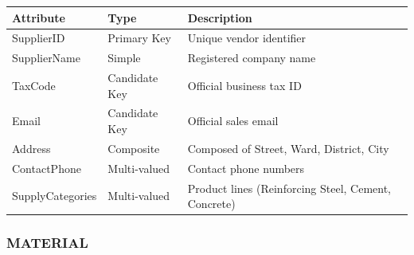 \documentclass[a4paper,12pt]{report}
\newcounter{none} %
\begin{document}
{\def\LTcaptype{none} %
\begin{longtable}[]{@{}
  >{\raggedright\arraybackslash}p{}
  >{\raggedright\arraybackslash}p{}
  >{\raggedright\arraybackslash}p{}@{}}
\toprule\noalign{}
\begin{minipage}[b]{\linewidth}\raggedright
Attribute
\end{minipage} & \begin{minipage}[b]{\linewidth}\raggedright
Type
\end{minipage} & \begin{minipage}[b]{\linewidth}\raggedright
Description
\end{minipage} \\
\midrule\noalign{}
\endhead
\bottomrule\noalign{}
\endlastfoot
SupplierID & Primary Key & Unique vendor identifier \\
SupplierName & Simple & Registered company name \\
TaxCode & Candidate Key & Official business tax ID \\
Email & Candidate Key & Official sales email \\
Address & Composite & Composed of Street, Ward, District, City \\
ContactPhone & Multi-valued & Contact phone numbers \\
SupplyCategories & Multi-valued & Product lines (\allowbreak{}Reinforcing Steel, Cement, Concrete) \\
\end{longtable}
}

\subsubsection{MATERIAL}\label{material}
\end{document}
